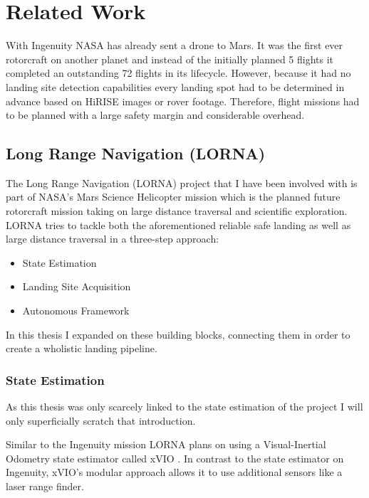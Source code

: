 \chapter{Related Work}
\label{sec:relwork}

With Ingenuity\citep{Ingenuity} NASA has already sent a drone to Mars. It was the first ever rotorcraft on another planet and instead of the initially planned 5 flights it completed an outstanding 72 flights in its lifecycle. However, because it had no landing site detection capabilities every landing spot had to be determined in advance based on HiRISE images or rover footage. Therefore, flight missions had to be planned with a large safety margin and considerable overhead. 


\section{Long Range Navigation (LORNA)}

The Long Range Navigation (LORNA) project that I have been involved with is part of NASA's Mars Science Helicopter mission which is the planned future rotorcraft mission taking on large distance traversal and scientific exploration. LORNA tries to tackle both the aforementioned reliable safe landing as well as large distance traversal in a three-step approach:

\begin{itemize}
    \item State Estimation \citep{XVIO, XMBL}
    \item Landing Site Acquisition \citep{LSDnSFM}
    \item Autonomous Framework \citep{Autonomy}
\end{itemize}

In this thesis I expanded on these building blocks, connecting them in order to create a wholistic landing pipeline.

\subsection{State Estimation}\label{sec:state_estimator}

As this thesis was only scarcely linked to the state estimation of the project I will only superficially scratch that introduction. 

Similar to the Ingenuity mission LORNA plans on using a Visual-Inertial Odometry state estimator called xVIO \citep{XVIO}. In contrast to the state estimator on Ingenuity, xVIO's modular approach allows it to use additional sensors like a laser range finder.


